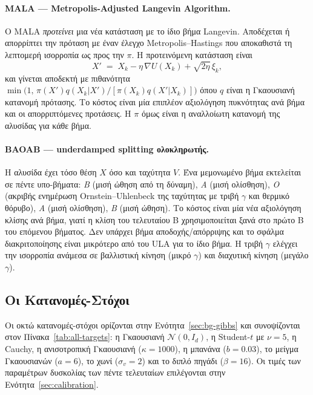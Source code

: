 \paragraph{MALA --- Metropolis-Adjusted Langevin Algorithm.}
Ο MALA \emph{προτείνει} μια νέα κατάσταση με το ίδιο βήμα Langevin.
Αποδέχεται ή απορρίπτει την πρόταση με έναν έλεγχο
Metropolis--Hastings που αποκαθιστά τη λεπτομερή ισορροπία ως προς την $\pi$.
Η προτεινόμενη κατάσταση είναι
\begin{equation}
  X' \;=\; X_k - \eta\, \nabla U(X_k) + \sqrt{2\eta}\, \xi_k,
\end{equation}
και γίνεται αποδεκτή με πιθανότητα $\min\bigl(1,\,\pi(X')q(X_k|X')/[\pi(X_k)q(X'|X_k)]\bigr)$
όπου $q$ είναι η Γκαουσιανή κατανομή πρότασης. Το κόστος είναι μία επιπλέον
αξιολόγηση πυκνότητας ανά βήμα και οι απορριπτόμενες προτάσεις.
Η $\pi$ όμως είναι η αναλλοίωτη κατανομή της αλυσίδας για κάθε βήμα.

\paragraph{BAOAB --- underdamped splitting ολοκληρωτής.}
Η αλυσίδα έχει τόσο θέση $X$ όσο και ταχύτητα $V$. Ένα μεμονωμένο βήμα
εκτελείται σε πέντε υπο-βήματα: \emph{B} (μισή ώθηση από τη δύναμη), \emph{A}
(μισή ολίσθηση), \emph{O} (ακριβής ενημέρωση Ornstein--Uhlenbeck της ταχύτητας
με τριβή $\gamma$ και θερμικό θόρυβο), \emph{A} (μισή ολίσθηση), \emph{B}
(μισή ώθηση). Το κόστος είναι μία νέα αξιολόγηση κλίσης ανά βήμα, γιατί η κλίση
του τελευταίου B χρησιμοποιείται ξανά στο πρώτο B του επόμενου βήματος. Δεν υπάρχει
βήμα αποδοχής/απόρριψης και το σφάλμα διακριτοποίησης είναι μικρότερο από του ULA
για το ίδιο βήμα. Η τριβή $\gamma$ ελέγχει την ισορροπία ανάμεσα σε
βαλλιστική κίνηση (μικρό $\gamma$) και διαχυτική κίνηση (μεγάλο $\gamma$).

\subsection{Οι Κατανομές-Στόχοι}

Οι οκτώ κατανομές-στόχοι ορίζονται στην Ενότητα~\ref{sec:bg-gibbs} και
συνοψίζονται στον Πίνακα~\ref{tab:all-targets}: η Γκαουσιανή $\mathcal{N}(0, I_d)$,
η Student-$t$ με $\nu = 5$, η Cauchy, η ανισοτροπική Γκαουσιανή ($\kappa = 1000$), η
μπανάνα ($b = 0.03$), το μείγμα Γκαουσιανών ($a = 6$), το χωνί ($\sigma_v = 2$) και το
διπλό πηγάδι ($\beta = 16$). Οι τιμές των παραμέτρων δυσκολίας των πέντε
τελευταίων επιλέγονται στην Ενότητα~\ref{sec:calibration}.

